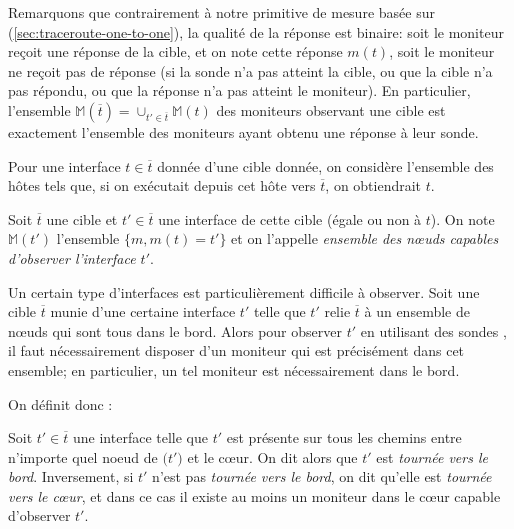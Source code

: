 Remarquons que contrairement à notre primitive de mesure basée sur \traceroute
(\ref{sec:traceroute-one-to-one}), la qualité de la réponse est binaire: soit le
moniteur reçoit une réponse de la cible, et on note cette réponse $m(t)$, soit
le moniteur ne reçoit pas de réponse (si la sonde n'a pas atteint
la cible, ou que la cible n'a pas répondu, ou que la réponse n'a pas atteint le
moniteur). En particulier, l'ensemble $\mathbb{M}(\overline{t}) = \cup_{t' \in
\overline{t}} {\mathbb M}(t)$ des moniteurs observant une cible est exactement
l'ensemble des moniteurs ayant obtenu une réponse à leur sonde.

Pour une interface $t \in \overline{t}$ donnée d'une cible donnée, on considère
l'ensemble des hôtes tels que, si on exécutait \udpping depuis cet hôte vers
$\overline{t}$, on obtiendrait $t$.

\begin{definition} Soit $\overline{t}$ une cible et $t' \in \overline{t}$ une interface de
cette cible (égale ou non à $t$). On note ${\mathbb M}(t')$ l'ensemble $\{ m,
m(t) = t'\}$ et on l'appelle {\em ensemble des n\oe{}uds capables d'observer
l'interface $t'$}.
\end{definition}

Un certain type d'interfaces est particulièrement difficile à observer. Soit une
cible $\overline{t}$ munie d'une certaine interface $t'$ telle que $t'$ relie
$\overline{t}$ à un ensemble de n\oe{}uds qui sont tous dans le bord. Alors pour
observer $t'$ en utilisant des sondes \udp, il faut nécessairement disposer d'un
moniteur qui est précisément dans cet ensemble; en particulier, un tel moniteur
est nécessairement dans le bord.

On définit donc :

\begin{definition} Soit
$t' \in \overline{t}$ une interface telle que $t'$ est présente sur tous les
chemins entre n'importe quel noeud de $\mathbb(t')$ et le c\oe{}ur. On dit alors
que $t'$ est {\em tournée vers le bord}. Inversement, si $t'$ n'est pas {\em
tournée vers le bord}, on dit qu'elle est {\em tournée vers le c\oe{}ur}, et
dans ce cas il existe au moins un moniteur dans le c\oe{}ur capable d'observer
$t'$.
\end{definition}

